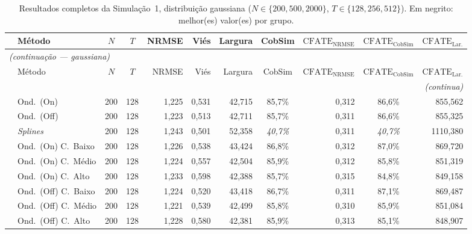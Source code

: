 \clearpage
\iniciapaisagemcomnumeracao
\begin{landscape}
{\footnotesize
\begin{longtable}{@{}llccrrrcrcr@{}}
\caption{Resultados completos da Simulação~1, distribuição gaussiana (\(N \in \{200, 500, 2000\}\), \(T \in \{128, 256, 512\}\)). Em negrito: melhor(es) valor(es) por grupo.}\label{tab:resultados_sim1_gauss} \\
\toprule
 & Método & $N$ & $T$ & NRMSE & Viés & Largura & CobSim & $\mathrm{CFATE}_{\mathrm{NRMSE}}$ & $\mathrm{CFATE}_{\mathrm{CobSim}}$ & $\mathrm{CFATE}_{\mathrm{Lar.}}$ \\
\midrule
\endfirsthead
\multicolumn{11}{l}{\itshape (continuação --- gaussiana)} \\
\toprule
 & Método & $N$ & $T$ & NRMSE & Viés & Largura & CobSim & $\mathrm{CFATE}_{\mathrm{NRMSE}}$ & $\mathrm{CFATE}_{\mathrm{CobSim}}$ & $\mathrm{CFATE}_{\mathrm{Lar.}}$ \\
\midrule
\endhead
\midrule \multicolumn{11}{r}{\itshape (continua)} \\
\endfoot
\bottomrule
\endlastfoot
  \multirow{9}{*}{\rotatebox[origin=c]{90}{Sigmoide}} & Ond.\ (On) & 200 & 128 & 1{,}225 & 0{,}531 & 42{,}715 & 85{,}7\% & 0{,}312 &  86{,}6\% & 855{,}562 \\*
   & Ond.\ (Off) & 200 & 128 & 1{,}223 & 0{,}513 & 42{,}711 & 85{,}7\% & 0{,}311 &  86{,}6\% & 855{,}325 \\*
   & \emph{Splines} & 200 & 128 & 1{,}243 & 0{,501} & 52{,}358 & \textit{40{,}7\%} & 0{,}311 &  \textit{40{,}7\%} & 1110{,}380 \\*
   & Ond.\ (On) C.\ Baixo & 200 & 128 & 1{,}226 & 0{,}538 & 43{,}424 & 86{,8\%} & 0{,}312 &  87{,}0\% & 869{,}720 \\*
   & Ond.\ (On) C.\ Médio & 200 & 128 & 1{,}224 & 0{,}557 & 42{,}504 & 85{,}9\% & 0{,}312 &  85{,}8\% & 851{,}319 \\*
   & Ond.\ (On) C.\ Alto & 200 & 128 & 1{,}233 & 0{,}598 & 42{,}388 & 85{,}7\% & 0{,}315 &  84{,}8\% & 849{,}158 \\*
   & Ond.\ (Off) C.\ Baixo & 200 & 128 & 1{,}224 & 0{,}520 & 43{,}418 & 86{,}7\% & 0{,}311 &  87{,}1\% & 869{,}487 \\*
   & Ond.\ (Off) C.\ Médio & 200 & 128 & 1{,221} & 0{,}539 & 42{,}499 & 85{,}8\% & 0{,}310 &  85{,}9\% & 851{,}084 \\*
   & Ond.\ (Off) C.\ Alto & 200 & 128 & 1{,}228 & 0{,}580 & 42{,}381 & 85{,}9\% & 0{,}313 &  85{,}1\% & 848{,}907 \\

\end{longtable}}
\end{landscape}
